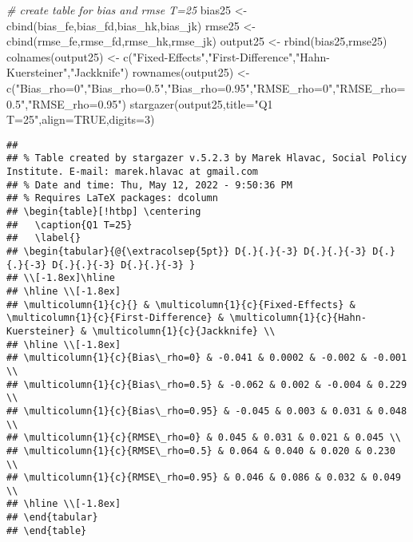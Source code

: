 \documentclass[
]{article}
\newenvironment{Shaded}{\begin{snugshade}}{\end{snugshade}}
\newcommand{\AttributeTok}[1]{\textcolor[rgb]{0.77,0.63,0.00}{#1}}
\newcommand{\CommentTok}[1]{\textcolor[rgb]{0.56,0.35,0.01}{\textit{#1}}}
\newcommand{\ConstantTok}[1]{\textcolor[rgb]{0.00,0.00,0.00}{#1}}
\newcommand{\DecValTok}[1]{\textcolor[rgb]{0.00,0.00,0.81}{#1}}
\newcommand{\FunctionTok}[1]{\textcolor[rgb]{0.00,0.00,0.00}{#1}}
\newcommand{\NormalTok}[1]{#1}
\newcommand{\OtherTok}[1]{\textcolor[rgb]{0.56,0.35,0.01}{#1}}
\newcommand{\StringTok}[1]{\textcolor[rgb]{0.31,0.60,0.02}{#1}}
\begin{document}
\begin{Shaded}
\begin{Highlighting}[]
\CommentTok{\# create table for bias and rmse T=25}
\NormalTok{bias25 }\OtherTok{\textless{}{-}} \FunctionTok{cbind}\NormalTok{(bias\_fe,bias\_fd,bias\_hk,bias\_jk)}
\NormalTok{rmse25 }\OtherTok{\textless{}{-}} \FunctionTok{cbind}\NormalTok{(rmse\_fe,rmse\_fd,rmse\_hk,rmse\_jk)}
\NormalTok{output25 }\OtherTok{\textless{}{-}} \FunctionTok{rbind}\NormalTok{(bias25,rmse25)}
\FunctionTok{colnames}\NormalTok{(output25) }\OtherTok{\textless{}{-}} \FunctionTok{c}\NormalTok{(}\StringTok{"Fixed{-}Effects"}\NormalTok{,}\StringTok{"First{-}Difference"}\NormalTok{,}\StringTok{"Hahn{-}Kuersteiner"}\NormalTok{,}\StringTok{"Jackknife"}\NormalTok{)}
\FunctionTok{rownames}\NormalTok{(output25) }\OtherTok{\textless{}{-}} \FunctionTok{c}\NormalTok{(}\StringTok{"Bias\_rho=0"}\NormalTok{,}\StringTok{"Bias\_rho=0.5"}\NormalTok{,}\StringTok{"Bias\_rho=0.95"}\NormalTok{,}\StringTok{"RMSE\_rho=0"}\NormalTok{,}\StringTok{"RMSE\_rho=0.5"}\NormalTok{,}\StringTok{"RMSE\_rho=0.95"}\NormalTok{)}
\FunctionTok{stargazer}\NormalTok{(output25,}\AttributeTok{title=}\StringTok{"Q1 T=25"}\NormalTok{,}\AttributeTok{align=}\ConstantTok{TRUE}\NormalTok{,}\AttributeTok{digits=}\DecValTok{3}\NormalTok{)}
\end{Highlighting}
\end{Shaded}

\begin{verbatim}
## 
## % Table created by stargazer v.5.2.3 by Marek Hlavac, Social Policy Institute. E-mail: marek.hlavac at gmail.com
## % Date and time: Thu, May 12, 2022 - 9:50:36 PM
## % Requires LaTeX packages: dcolumn 
## \begin{table}[!htbp] \centering 
##   \caption{Q1 T=25} 
##   \label{} 
## \begin{tabular}{@{\extracolsep{5pt}} D{.}{.}{-3} D{.}{.}{-3} D{.}{.}{-3} D{.}{.}{-3} D{.}{.}{-3} } 
## \\[-1.8ex]\hline 
## \hline \\[-1.8ex] 
## \multicolumn{1}{c}{} & \multicolumn{1}{c}{Fixed-Effects} & \multicolumn{1}{c}{First-Difference} & \multicolumn{1}{c}{Hahn-Kuersteiner} & \multicolumn{1}{c}{Jackknife} \\ 
## \hline \\[-1.8ex] 
## \multicolumn{1}{c}{Bias\_rho=0} & -0.041 & 0.0002 & -0.002 & -0.001 \\ 
## \multicolumn{1}{c}{Bias\_rho=0.5} & -0.062 & 0.002 & -0.004 & 0.229 \\ 
## \multicolumn{1}{c}{Bias\_rho=0.95} & -0.045 & 0.003 & 0.031 & 0.048 \\ 
## \multicolumn{1}{c}{RMSE\_rho=0} & 0.045 & 0.031 & 0.021 & 0.045 \\ 
## \multicolumn{1}{c}{RMSE\_rho=0.5} & 0.064 & 0.040 & 0.020 & 0.230 \\ 
## \multicolumn{1}{c}{RMSE\_rho=0.95} & 0.046 & 0.086 & 0.032 & 0.049 \\ 
## \hline \\[-1.8ex] 
## \end{tabular} 
## \end{table}
\end{verbatim}
\end{document}
